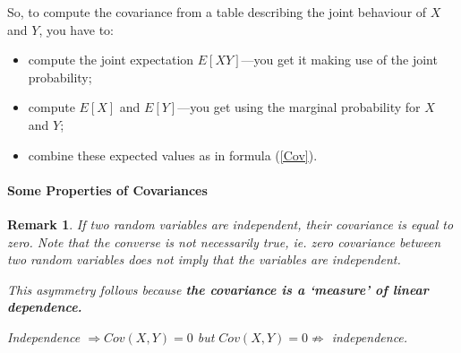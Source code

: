 \documentclass[notes=show,handout]{beamer}\usepackage[]{graphicx}\usepackage[]{color}
\newenvironment{stepitemize}{\begin{itemize}[<+->]}{\end{itemize} }
\newtheorem{remark}{Remark}[section]
\renewcommand{\Pr}{P}
\begin{document}
\begin{frame}{\secname}
  So, to compute the covariance from a table describing the joint behaviour of $X$ and $Y$, you have to:

  \begin{itemize}
  \item compute the joint expectation $E[XY]$---you get it making use of the joint probability; \vspace{0.2cm}
  \item compute $E[X]$ and $E[Y]$---you get using the marginal probability for $X$ and $Y$; \vspace{0.2cm}
  \item combine these expected values as in formula (\ref{Cov}).

  \end{itemize}

\end{frame}



%
%
%
%
%
%

\begin{frame}{\secname}
  \framesubtitle{Some Properties of Covariances}

  \begin{remark}
   If two random variables are independent, their covariance is equal to zero.
  \medskip
  Note that the converse is not necessarily true, ie. zero covariance between two random variables does not imply that the variables are independent.

  This asymmetry follows because \textbf{the covariance is  a `measure' of linear dependence.}

  \begin{center}
  Independence $\Rightarrow Cov(X,Y)=0$ but $Cov(X,Y)=0\nRightarrow$ independence.
  \end{center}
  \end{remark}
\end{frame}
\end{document}
